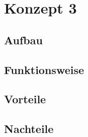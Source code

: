 \section{Konzept 3}

\subsection{Aufbau}

\subsection{Funktionsweise}

\subsection{Vorteile}

\subsection{Nachteile}

